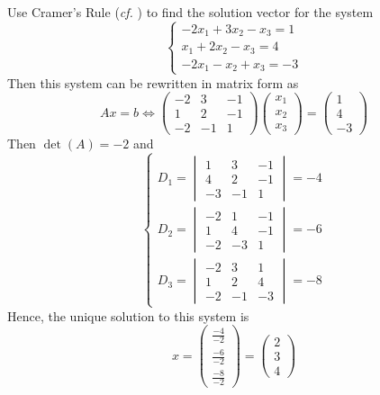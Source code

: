 \begin{exm}
	Use Cramer's Rule (\textit{cf.} ) to find
	the solution vector for the system
	\begin{equation*}
		\begin{cases}
			-2x_1 + 3x_2 - x_3 = 1 \\
			x_1 + 2x_2 - x_3 = 4   \\
			-2x_1 -  x_2 + x_3 = -3
		\end{cases}
	\end{equation*}
	Then this system can be rewritten in matrix form as
	\begin{equation*}
		Ax=b \Leftrightarrow
		\begin{pmatrix}
			-2 & 3  & -1 \\
			1  & 2  & -1 \\
			-2 & -1 & 1
		\end{pmatrix}
		\begin{pmatrix}
			x_1 \\
			x_2 \\
			x_3
		\end{pmatrix}
		=\begin{pmatrix}
			1 \\
			4 \\ -3
		\end{pmatrix}
	\end{equation*}
	Then $\det(A)=-2$ and
	\begin{equation*}
		\begin{cases}
			D_1 = \begin{vmatrix}
				1  & 3  & -1 \\
				4  & 2  & -1 \\
				-3 & -1 & 1
			\end{vmatrix}=-4 \\[18pt]
			D_2 = \begin{vmatrix}
				-2 & 1  & -1 \\
				1  & 4  & -1 \\
				-2 & -3 & 1
			\end{vmatrix}=-6 \\[18pt]
			D_3 = \begin{vmatrix}
				-2 & 3  & 1  \\
				1  & 2  & 4  \\
				-2 & -1 & -3
			\end{vmatrix}=-8
		\end{cases}
	\end{equation*}
	Hence, the unique solution to this system is
	\begin{equation*}
		x = \begin{pmatrix}
			\frac{-4}{-2} \\[4pt]
			\frac{-6}{-2} \\[4pt]
			\frac{-8}{-2}
		\end{pmatrix}=
		\begin{pmatrix}
			2 \\
			3 \\
			4
		\end{pmatrix}
	\end{equation*}
\end{exm}

